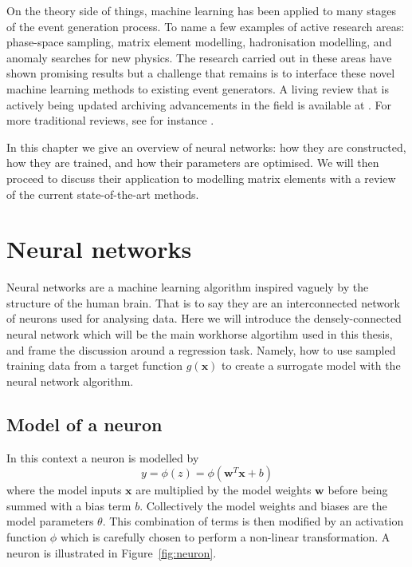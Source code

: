 \documentclass[main.tex]{subfiles}
\begin{document}
    On the theory side of things, machine learning
    has been applied to many stages of the event
    generation process.
    To name a few examples of active research areas:
    phase-space sampling, matrix element modelling, hadronisation modelling,
    and anomaly searches for new physics.
    The research carried out in these areas have shown
    promising results but a challenge that remains
    is to interface these novel machine learning methods
    to existing event generators.
    A living review that is actively being updated
    archiving advancements in the field is available
    at \cite{Feickert:2021ajf}.
    For more traditional reviews, see for instance
    \cite{Guest:2018yhq,Radovic:2018dip,Butter:2022rso}.

    In this chapter we give an overview of neural
    networks: how they are constructed, how
    they are trained, and how their parameters are optimised.
    We will then proceed to discuss their
    application to modelling matrix
    elements with a review of the current
    state-of-the-art methods.

\section{Neural networks}
    Neural networks are a machine learning algorithm
    inspired vaguely by the structure of the human brain.
    That is to say they are an interconnected network
    of neurons used for analysing data. Here we will
    introduce the densely-connected neural network
    which will be the main workhorse algortihm used
    in this thesis, and frame the discussion around a
    regression task. Namely, how to use sampled training data
    from a target function $g(\mathbf{x})$ to create a surrogate
    model with the neural network algorithm.

\subsection{Model of a neuron}
    In this context a neuron is modelled by
    \begin{equation}\label{eqn:neuron}
        y = \phi(z) = \phi(\mathbf{w}^{T}\mathbf{x} + b)
    \end{equation}
    where the model inputs $\mathbf{x}$ are multiplied
    by the model weights $\mathbf{w}$ before being summed
    with a bias term $b$. Collectively the model weights
    and biases are the model parameters $\theta$.
    This combination of terms is then modified
    by an activation function $\phi$ which is carefully
    chosen to perform a non-linear transformation. A neuron
    is illustrated in Figure~\ref{fig:neuron}.
    
\end{document}
